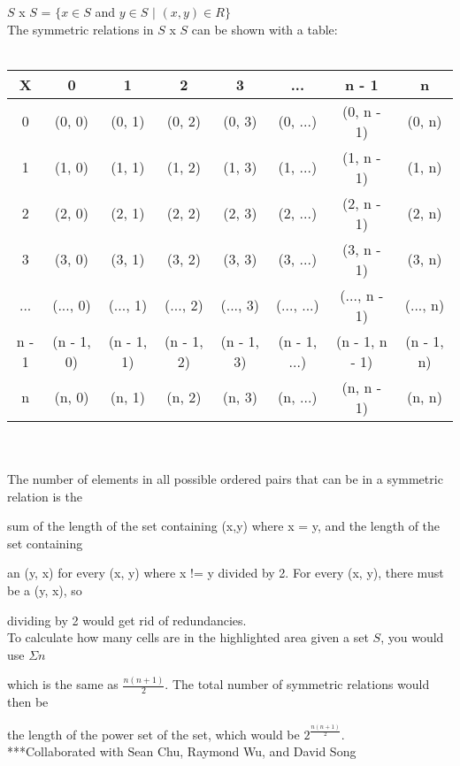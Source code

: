 \documentclass[11pt]{article}
\begin{document}
	$S$ x $S$ = $\{ x \in S$ and $y \in S$ $|$ $(x, y) \in R\}$\\

	The symmetric relations in $S$ x $S$ can be shown with a table: \\\\

	\begin{tabular}{|c |c c c c c c c|} 
 		\hline
 		X & 0 & 1 & 2 & 3 &... & n - 1 & n\\ [0.5ex] 
 		\hline
 		0 & \cellcolor{blue!25}(0, 0) & (0, 1) & (0, 2) & (0, 3) & (0, ...) & (0, n - 1) & (0, n)\\ 
 		\hline
		1 & \cellcolor{red!25}(1, 0) & \cellcolor{blue!25}(1, 1) & (1, 2) & (1, 3) & (1, ...) & (1, n - 1) & (1, n)\\ 
 		\hline
		2 & \cellcolor{red!25}(2, 0) & \cellcolor{red!25}(2, 1) & \cellcolor{blue!25}(2, 2) & (2, 3) & (2, ...) & (2, n - 1) & (2, n)\\ 
 		\hline
		3 & \cellcolor{red!25}(3, 0) & \cellcolor{red!25}(3, 1) & \cellcolor{red!25}(3, 2) & \cellcolor{blue!25}(3, 3) & (3, ...) & (3, n - 1) & (3, n)\\ 
 		\hline
		... & \cellcolor{red!25}(..., 0) & \cellcolor{red!25}(..., 1) & \cellcolor{red!25}(..., 2) & \cellcolor{red!25}(..., 3) & \cellcolor{blue!25}(..., ...) & (..., n - 1) & (..., n)\\ 
 		\hline
		n - 1 & \cellcolor{red!25}(n - 1, 0) & \cellcolor{red!25}(n - 1, 1) & \cellcolor{red!25}(n - 1, 2) & \cellcolor{red!25}(n - 1, 3) & \cellcolor{red!25}(n - 1, ...) & \cellcolor{blue!25}(n - 1, n - 1) & (n - 1, n)\\ 
 		\hline
		n & \cellcolor{red!25}(n, 0) & \cellcolor{red!25}(n, 1) & \cellcolor{red!25}(n, 2) & \cellcolor{red!25}(n, 3) & \cellcolor{red!25}(n, ...) & \cellcolor{red!25}(n, n - 1) & \cellcolor{blue!25}(n, n)\\ 
 		\hline
	\end{tabular}\\\\
		
	The number of elements in all possible ordered pairs that can be in a symmetric relation is the

	 sum of the length of the set containing (x,y) where x = y, and the length of the set containing
	
	 an (y, x) for every (x, y) where x != y divided by 2. For every (x, y), there must be a (y, x), so

	dividing by 2 would get rid of redundancies. \\

	To calculate how many cells are in the highlighted area given a set $S$, you would use $\Sigma n$ 

	which is the same as $\frac{n(n+1)}{2}$. The total number of symmetric relations would then be

	the length of the power set of the set, which would be $2^{\frac{n(n+1)}{2}}$. \\

***Collaborated with Sean Chu, Raymond Wu, and David Song

	

	 
	
\end{document}
